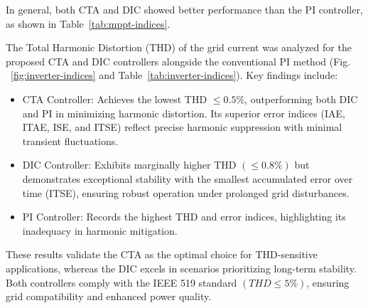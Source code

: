 \documentclass[preprint,12pt]{elsarticle}
\begin{document}
In general, both CTA and DIC showed better performance than the PI controller, as shown in Table~\ref{tab:mppt-indices}.
\begin{table}[htbp]
    \centering
    \caption{Comparison of performance indices at MPPT Controller}
    \label{tab:mppt-indices}
    \renewcommand{\arraystretch}{1.3} %
    
\end{table}

The Total Harmonic Distortion (THD) of the grid current was analyzed for the proposed CTA and DIC controllers alongside the conventional PI method (Fig. ~\ref{fig:inverter-indices} and Table~\ref{tab:inverter-indices}). Key findings include:
\begin{itemize}
 \item CTA Controller: Achieves the lowest THD $\leq 0.5\%$, outperforming both DIC and PI in minimizing harmonic distortion. Its superior error indices (IAE, ITAE, ISE, and ITSE) reflect precise harmonic suppression with minimal transient fluctuations.

\item DIC Controller: Exhibits marginally higher THD $(\leq 0.8\%)$ but demonstrates exceptional stability with the smallest accumulated error over time (ITSE), ensuring robust operation under prolonged grid disturbances.

\item PI Controller: Records the highest THD and error indices, highlighting its inadequacy in harmonic mitigation.
\end{itemize}
These results validate the CTA as the optimal choice for THD-sensitive applications, whereas the DIC excels in scenarios prioritizing long-term stability. Both controllers comply with the IEEE 519 standard $(THD \leq 5\%)$, ensuring grid compatibility and enhanced power quality.
\end{document}
